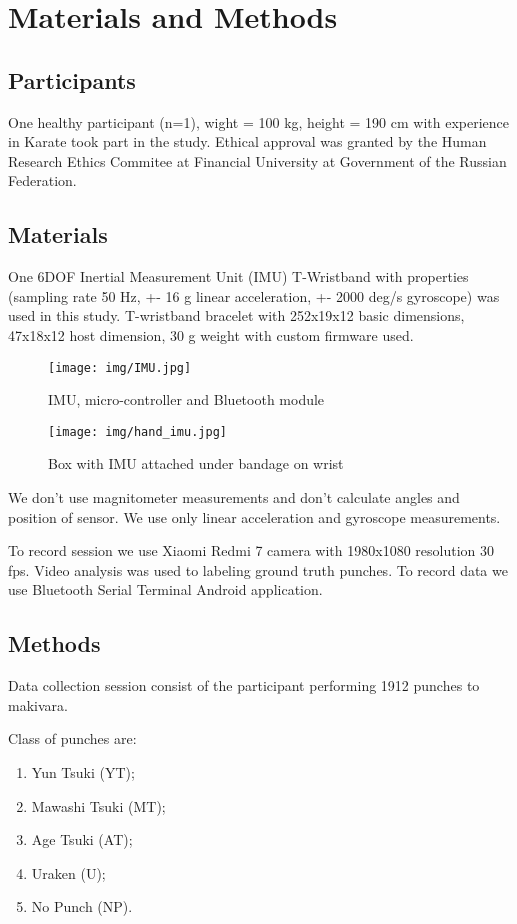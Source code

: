 \documentclass[sport,article,submit,moreauthors,pdftex]{Definitions/mdpi}
\begin{document}
\section{Materials and Methods}
\subsection{Participants}
One healthy participant (n=1), wight = 100 kg, height = 190 cm with experience in Karate took part in the study. Ethical approval was granted by the Human Research Ethics Commitee at Financial University at Government of the Russian Federation.
\subsection{Materials}
One 6DOF Inertial Measurement Unit (IMU) T-Wristband with properties (sampling rate 50 Hz, +- 16 g linear acceleration, +- 2000 deg/s gyroscope) was used in this study. T-wristband bracelet with 252x19x12 basic dimensions, 47x18x12 host dimension, 30 g weight with custom firmware used.

\begin{figure}[H]
\texttt{[image: img/IMU.jpg]}
\caption{IMU, micro-controller and Bluetooth module}
\end{figure} 

\begin{figure}[H]
\texttt{[image: img/hand\_imu.jpg]}
\caption{Box with IMU attached under bandage on wrist}
\end{figure} 

We don't use magnitometer measurements and don't calculate angles and position of sensor. We use only linear acceleration and gyroscope measurements.

To record session we use Xiaomi Redmi 7 camera with 1980x1080 resolution 30 fps. Video analysis was used to labeling ground truth punches. To record data we use Bluetooth Serial Terminal Android application.
\subsection{Methods}
Data collection session consist of the participant performing 1912 punches to makivara.

Class of punches are:
\begin{enumerate}
\item	Yun Tsuki (YT); 
\item	Mawashi Tsuki (MT);
\item	Age Tsuki (AT);
\item	Uraken (U);
\item	No Punch (NP).
\end{enumerate}
\end{document}
